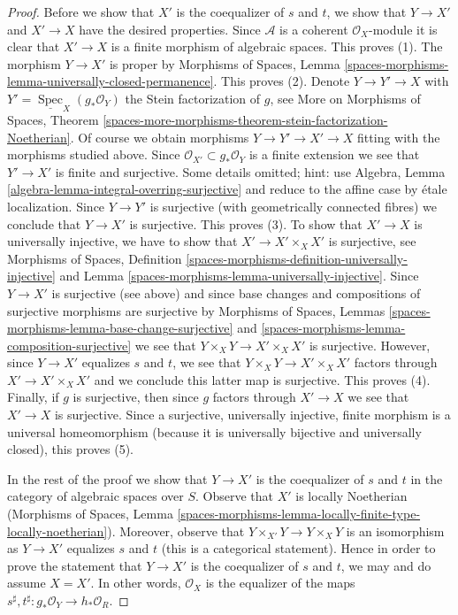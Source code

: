 \documentclass[10pt,a4paper]{amsart}
\theoremstyle{plain}
\theoremstyle{definition}
\theoremstyle{remark}
\numberwithin{equation}{subsection}
\def\Spec{\mathop{\mathrm{Spec}}}
\begin{document}
\begin{proof}
\medskip\noindent
Before we show that $X'$ is the coequalizer of $s$ and $t$, we show
that $Y \to X'$ and $X' \to X$ have the desired properties. Since $\mathcal{A}$
is a coherent $\mathcal{O}_X$-module it is clear that $X' \to X$ is a
finite morphism of algebraic spaces. This proves (1).
The morphism $Y \to X'$ is proper by Morphisms of Spaces, Lemma
\ref{spaces-morphisms-lemma-universally-closed-permanence}. This proves (2).
Denote $Y \to Y' \to X$ with
$Y' = \underline{\Spec}_X(g_*\mathcal{O}_Y)$ the Stein factorization of $g$,
see More on Morphisms of Spaces, Theorem
\ref{spaces-more-morphisms-theorem-stein-factorization-Noetherian}.
Of course we obtain morphisms $Y \to Y' \to X' \to X$ fitting
with the morphisms studied above.
Since $\mathcal{O}_{X'} \subset g_*\mathcal{O}_Y$ is a finite extension
we see that $Y' \to X'$ is finite and surjective.
Some details omitted; hint: use
Algebra, Lemma \ref{algebra-lemma-integral-overring-surjective}
and reduce to the affine case by \'etale localization.
Since $Y \to Y'$ is surjective (with geometrically connected fibres)
we conclude that $Y \to X'$ is surjective. This proves (3).
To show that $X' \to X$ is universally injective, we have to show
that $X' \to X' \times_X X'$ is surjective, see
Morphisms of Spaces, Definition
\ref{spaces-morphisms-definition-universally-injective} and
Lemma \ref{spaces-morphisms-lemma-universally-injective}.
Since $Y \to X'$ is surjective (see above) and since base changes
and compositions of surjective morphisms are surjective by
Morphisms of Spaces, Lemmas
\ref{spaces-morphisms-lemma-base-change-surjective} and
\ref{spaces-morphisms-lemma-composition-surjective}
we see that $Y \times_X Y \to X' \times_X X'$ is surjective.
However, since $Y \to X'$ equalizes $s$ and $t$, we see that
$Y \times_X Y \to X' \times_X X'$ factors through $X' \to X' \times_X X'$
and we conclude this latter map is surjective. This proves (4).
Finally, if $g$ is surjective, then since $g$ factors through $X' \to X$
we see that $X' \to X$ is surjective. Since a surjective, universally
injective, finite morphism is a universal homeomorphism (because it
is universally bijective and universally closed), this proves (5).

\medskip\noindent
In the rest of the proof we show that $Y \to X'$ is the coequalizer
of $s$ and $t$ in the category of algebraic spaces over $S$.
Observe that $X'$ is locally Noetherian
(Morphisms of Spaces, Lemma
\ref{spaces-morphisms-lemma-locally-finite-type-locally-noetherian}).
Moreover, observe that $Y \times_{X'} Y \to Y \times_X Y$ is an
isomorphism as $Y \to X'$ equalizes $s$ and $t$ (this is a categorical
statement). Hence in order to prove the statement that $Y \to X'$
is the coequalizer of $s$ and $t$, we may and do assume $X = X'$.
In other words, $\mathcal{O}_X$ is the equalizer of the maps
$s^\sharp, t^\sharp : g_*\mathcal{O}_Y \to h_*\mathcal{O}_R$.


\end{proof}
\end{document}
